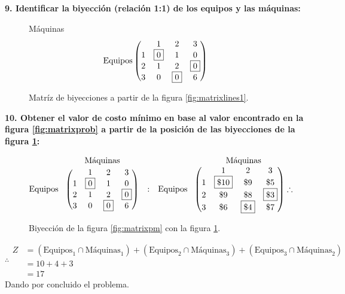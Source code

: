 \documentclass[letterpaper, 12pt]{article}
\begin{document}
    \justify
    \textbf{9. Identificar la biyección (relación 1:1) de los equipos y las máquinas:}
    \begin{figure}[H]
        \centering
        Máquinas
        \[\text{Equipos}\begin{pmatrix}
             &1&2&3\\
            1&\fbox{0}&1&0\\
            2&1&2&\fbox{0}\\
            3&0&\fbox{0}&6
        \end{pmatrix}\]
        \caption{Matríz de biyecciones a partir de la figura \ref{fig:matrixlines1}.}
        \label{fig:matrixbiy}
    \end{figure}
    \justify
    \textbf{10. Obtener el valor de costo mínimo en base al valor encontrado en la figura \ref{fig:matrixprob} a partir de la posición de las biyecciones de la figura \ref{fig:matrixbiy}:}
    \begin{figure}[H]
        \centering
        \[\begin{matrix}
            &\text{Máquinas}& & &\text{Máquinas}\\
            \text{Equipos}\!&\begin{pmatrix}
                &1&2&3\\
               1&\fbox{0}&1&0\\
               2&1&2&\fbox{0}\\
               3&0&\fbox{0}&6
           \end{pmatrix}&:&\text{Equipos}\!&\begin{pmatrix}
            &1&2&3\\
           1&\fbox{\$10}&\$9&\$5\\
           2&\$9&\$8&\fbox{\$3}\\
           3&\$6&\fbox{\$4}&\$7
       \end{pmatrix}\therefore
        \end{matrix}\]
        \caption{Biyección de la figura \ref{fig:matrixpm} con la figura \ref{fig:matrixbiy}.}
        \label{fig:relationbiy}
    \end{figure}
    \[\therefore\begin{matrix}
        Z&=\left(\text{Equipos}_1\cap \text{Máquinas}_1 \right)+ \left(\text{Equipos}_2\cap \text{Máquinas}_3\right) + \left(\text{Equipos}_3\cap \text{Máquinas}_2\right)&\\
         &=10+4+3&\\
         &=17&
    \end{matrix}\]
    Dando por concluido el problema.
\end{document}
